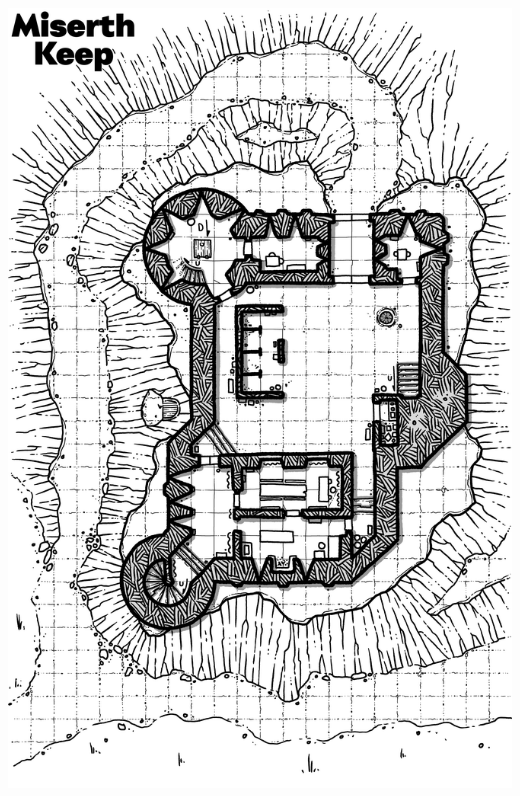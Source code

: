\documentclass[
]{book}
\begin{document}
\begin{center}\includegraphics[width=1\linewidth]{graphics/miserth-keep-main} \end{center}
\end{document}
